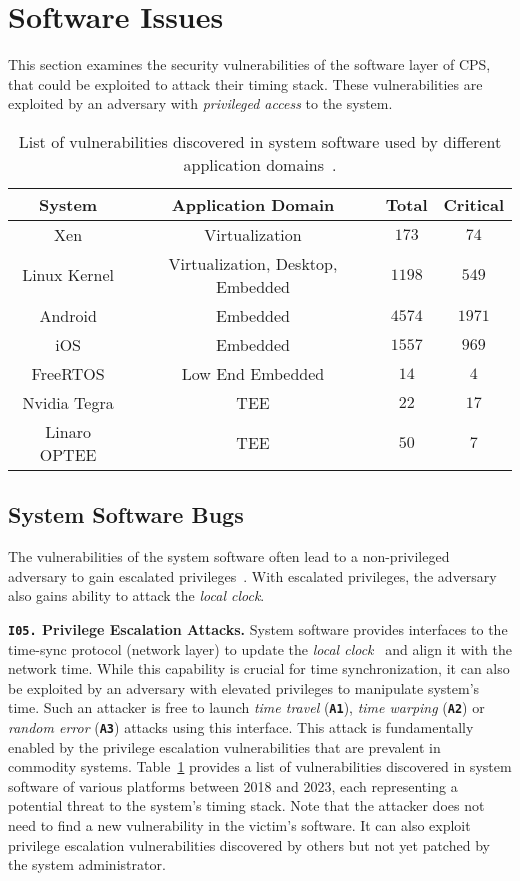 \section{Software Issues} 
This section examines the security vulnerabilities of the software layer of CPS, that could be exploited to attack their timing stack. These vulnerabilities are exploited by an adversary with \textit{privileged access} to the system. 

\begin{table}
\scriptsize
\centering
\begin{tabular}{
 | c | c | c | c | }
 \hline
  \textbf{System} & \textbf{Application Domain} & \textbf{Total} & \textbf{Critical} \\
 \hline
 \hline
Xen  & Virtualization & $173$ & $74$   \\
 \hline
 \hline
 Linux Kernel & Virtualization, Desktop, Embedded & $1198$ & $549$   \\
 \hline
 Android  & Embedded & $4574$ & $1971$  \\
 \hline
 iOS & Embedded & $1557$ & $969$   \\
 \hline
 FreeRTOS  & Low End Embedded & $14$ & $4$   \\
 \hline
 \hline
  Nvidia Tegra  & TEE & $22$ & $17$   \\
 \hline
  Linaro OPTEE  & TEE & $50$ & $7$   \\
 \hline
\end{tabular}
\caption{List of vulnerabilities discovered in system software used by different application domains~\cite{cve-details}.}
\label{tab:cve-stats}
\end{table}

\subsection{System Software Bugs} The vulnerabilities of the system software often lead to a non-privileged adversary to gain escalated privileges~\cite{sanitizing-for-security}. With escalated privileges, the adversary also gains ability to attack the \textit{local clock}.

\noindent\textbf{\texttt{I05.} Privilege Escalation Attacks.} System software provides interfaces to the time-sync protocol (network layer) to update the \textit{local clock}~\cite{linux-adjtime} and align it with the network time. While this capability is crucial for time synchronization, it can also be exploited by an adversary with elevated privileges to manipulate system's time. Such an attacker is free to launch \textit{time travel} (\textbf{\texttt{A1}}), \textit{time warping} (\textbf{\texttt{A2}}) or \textit{random error} (\textbf{\texttt{A3}}) attacks using this interface. This attack is fundamentally enabled by the privilege escalation vulnerabilities that are prevalent in commodity systems. Table~\ref{tab:cve-stats} provides a list of vulnerabilities discovered in system software of various platforms between 2018 and 2023, each representing a potential threat to the system's timing stack. Note that the attacker does not need to find a new vulnerability in the victim's software. It can also exploit privilege escalation vulnerabilities discovered by others but not yet patched by the system administrator.

